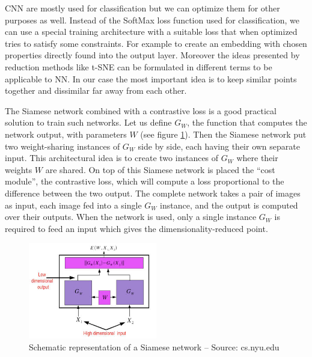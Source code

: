 \documentclass[a4paper,12pt]{report}
\begin{document}
CNN are mostly used for classification but we can optimize them for other purposes as well.
Instead of the SoftMax loss function used for classification, we can use a special training architecture with a suitable loss that when optimized tries to satisfy some constraints.
For example to create an embedding with chosen properties directly found into the output layer.
Moreover the ideas presented by reduction methods like t-SNE can be formulated in different terms to be applicable to NN.
In our case the most important idea is to keep similar points together and dissimilar far away from each other.

The Siamese network combined with a contrastive loss is a good practical solution to train such networks\cite{bromley1993signature}\cite{chopra2005learning}.
Let us define $G_W$, the function that computes the network output, with parameters $W$ (see figure \ref{fig:siamese_network}).
Then the Siamese network put two weight-sharing instances of $G_W$ side by side, each having their own separate input.
This architectural idea is to create two instances of $G_W$ where their weights $W$ are shared.
On top of this Siamese network is placed the ``cost module'', the contrastive loss, which will compute a loss proportional to the difference between the two output.
The complete network takes a pair of images as input, each image fed into a single $G_W$ instance, and the output is computed over their outputs.
When the network is used, only a single instance $G_W$ is required to feed an input which gives the dimensionality-reduced point.

\begin{figure}[t]
    \begin{center}
        \includegraphics[width=0.5\textwidth]{thesis_figures/siamese_network.jpg}
    \end{center}
    \caption{Schematic representation of a Siamese network -- Source: cs.nyu.edu}
    \label{fig:siamese_network}
\end{figure}
\end{document}
